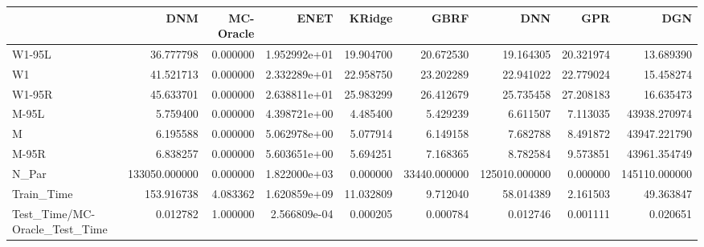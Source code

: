 \begin{tabular}{lrrrrrrrr}
\toprule
{} &            DNM &  MC-Oracle &          ENET &     KRidge &          GBRF &            DNN &        GPR &            DGN \\
\midrule
W1-95L                        &      36.777798 &   0.000000 &  1.952992e+01 &  19.904700 &     20.672530 &      19.164305 &  20.321974 &      13.689390 \\
W1                            &      41.521713 &   0.000000 &  2.332289e+01 &  22.958750 &     23.202289 &      22.941022 &  22.779024 &      15.458274 \\
W1-95R                        &      45.633701 &   0.000000 &  2.638811e+01 &  25.983299 &     26.412679 &      25.735458 &  27.208183 &      16.635473 \\
M-95L                         &       5.759400 &   0.000000 &  4.398721e+00 &   4.485400 &      5.429239 &       6.611507 &   7.113035 &   43938.270974 \\
M                             &       6.195588 &   0.000000 &  5.062978e+00 &   5.077914 &      6.149158 &       7.682788 &   8.491872 &   43947.221790 \\
M-95R                         &       6.838257 &   0.000000 &  5.603651e+00 &   5.694251 &      7.168365 &       8.782584 &   9.573851 &   43961.354749 \\
N\_Par                         &  133050.000000 &   0.000000 &  1.822000e+03 &   0.000000 &  33440.000000 &  125010.000000 &   0.000000 &  145110.000000 \\
Train\_Time                    &     153.916738 &   4.083362 &  1.620859e+09 &  11.032809 &      9.712040 &      58.014389 &   2.161503 &      49.363847 \\
Test\_Time/MC-Oracle\_Test\_Time &       0.012782 &   1.000000 &  2.566809e-04 &   0.000205 &      0.000784 &       0.012746 &   0.001111 &       0.020651 \\
\bottomrule
\end{tabular}
